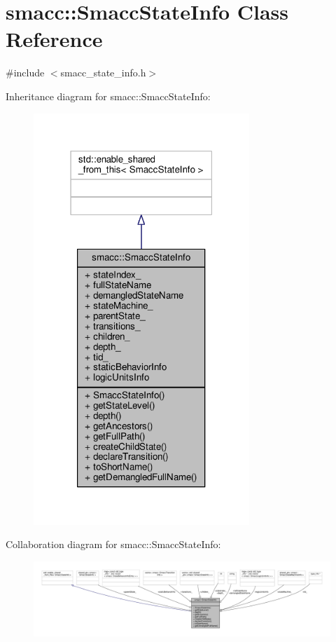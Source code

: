 \hypertarget{classsmacc_1_1SmaccStateInfo}{}\section{smacc\+:\+:Smacc\+State\+Info Class Reference}
\label{classsmacc_1_1SmaccStateInfo}


{\ttfamily \#include $<$smacc\+\_\+state\+\_\+info.\+h$>$}



Inheritance diagram for smacc\+:\+:Smacc\+State\+Info\+:
\nopagebreak
\begin{figure}[H]
\begin{center}
\leavevmode
\includegraphics[width=231pt]{classsmacc_1_1SmaccStateInfo__inherit__graph}
\end{center}
\end{figure}


Collaboration diagram for smacc\+:\+:Smacc\+State\+Info\+:
\nopagebreak
\begin{figure}[H]
\begin{center}
\leavevmode
\includegraphics[width=350pt]{classsmacc_1_1SmaccStateInfo__coll__graph}
\end{center}
\end{figure}
